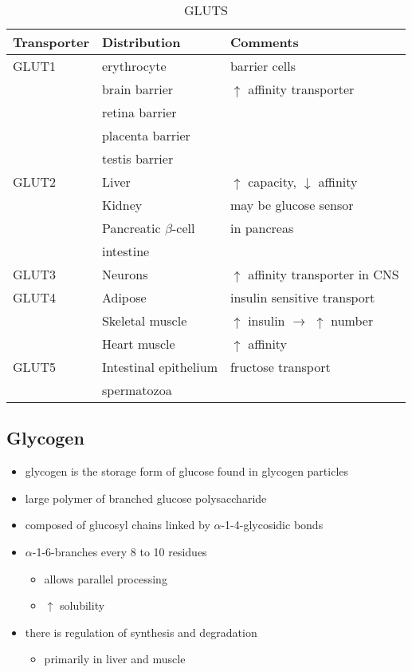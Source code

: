 \documentclass{scrartcl}
\begin{document}
\begin{table}[htbp]
\caption[GLUTS]{\label{tab:org6295d52}
GLUTS}
\centering
\begin{tabular}{lll}
Transporter & Distribution & Comments\\
\hline
GLUT1 & erythrocyte & barrier cells\\
 & brain barrier & \(\uparrow\) affinity transporter\\
 & retina barrier & \\
 & placenta barrier & \\
 & testis barrier & \\
\hline
GLUT2 & Liver & \(\uparrow\) capacity, \(\downarrow\) affinity\\
 & Kidney & may be glucose sensor\\
 & Pancreatic \(\beta\)-cell & in pancreas\\
 & intestine & \\
\hline
GLUT3 & Neurons & \(\uparrow\) affinity  transporter in CNS\\
\hline
GLUT4 & Adipose & insulin sensitive transport\\
 & Skeletal muscle & \(\uparrow\) insulin \(\to\) \(\uparrow\) number\\
 & Heart muscle & \(\uparrow\) affinity\\
\hline
GLUT5 & Intestinal epithelium & fructose transport\\
 & spermatozoa & \\
\end{tabular}
\end{table}

\subsection{Glycogen}
\label{sec:orgb878a68}
\begin{itemize}
\item glycogen is the storage form of glucose found in glycogen particles
\item large polymer of branched glucose polysaccharide
\item composed of glucosyl chains linked by \(\alpha\)-1-4-glycosidic bonds
\item \(\alpha\)-1-6-branches every 8 to 10 residues
\begin{itemize}
\item allows parallel processing
\item \(\uparrow\) solubility
\end{itemize}

\item there is regulation of synthesis and degradation
\begin{itemize}
\item primarily in liver and muscle
\end{itemize}
\end{itemize}
\end{document}

